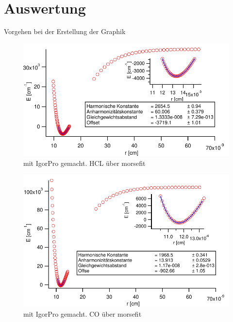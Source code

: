 \section{Auswertung}

Vorgehen bei der Erstellung der Graphik\\[5ex]

\begin{figure}[ht]
	\centering	
	\begin{minipage}{1\textwidth}
	\includegraphics[width=\columnwidth]{Bilder/HCLGraph.pdf}
	\end{minipage}
	
	
	\caption{mit IgorPro gemacht. HCL über morsefit}
	
	
\end{figure}

\begin{figure}[ht]
	\centering	
	\begin{minipage}{1\textwidth}
	\includegraphics[width=\columnwidth]{Bilder/Graph2.pdf}
	\end{minipage}
	
	
	\caption{mit IgorPro gemacht. CO über morsefit}
	
	
\end{figure}


